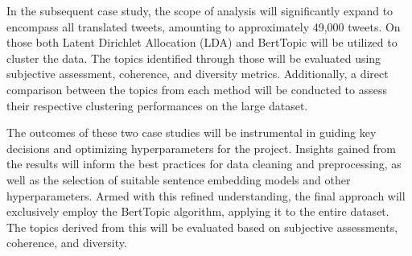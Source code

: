 \documentclass[
    11pt,
    a4paper,
    egregdoesnotlikesansseriftitles,
    toc=chapterentrywithdots,
    oneside,openright,
    titlepage,
    parskip=half,
    headings=normal,  %
    listof=totoc,
    bibliography=totoc,
    index=totoc,
    captions=tableheading,  %
    chapterprefix,
    listof=flat,
    final
]{scrbook}
\begin{document}
In the subsequent case study, the scope of analysis will significantly expand to encompass all translated tweets, amounting to approximately 49,000 tweets. On those both Latent Dirichlet Allocation (LDA) and BertTopic will be utilized to cluster the data.
The topics identified through those will be evaluated using subjective assessment, coherence, and diversity metrics. Additionally, a direct comparison between the topics from each method will be conducted to assess their respective clustering performances on the large dataset.

The outcomes of these two case studies will be instrumental in guiding key decisions and optimizing hyperparameters for the project. Insights gained from the results will inform the best practices for data cleaning and preprocessing, as well as the selection of suitable sentence embedding models and other hyperparameters. Armed with this refined understanding, the final approach will exclusively employ the BertTopic algorithm, applying it to the entire dataset.
The topics derived from this will be evaluated based on subjective assessments, coherence, and diversity.

\backmatter

\cleardoublepage



\printnoidxglossaries
  \renewcommand\bibname{Literaturverzeichnis} 


\end{document}
